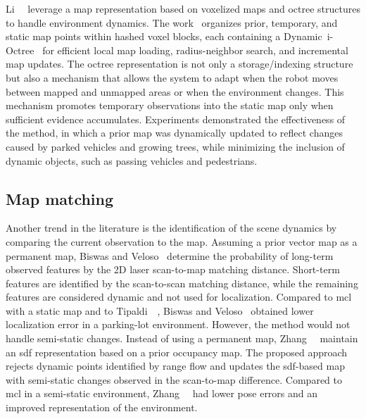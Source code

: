Li~\etal~\cite{li:tim:2025} leverage a map representation based on
voxelized maps and octree structures to handle environment dynamics.
The work~\cite{li:tim:2025} organizes prior, temporary, and static map points
within hashed voxel blocks, each containing a
Dynamic~i-Octree~\cite{zhu:icra:2024} for efficient local map loading,
radius-neighbor search, and incremental map updates.
The octree representation is not only a storage/indexing structure
but also a mechanism that allows the system to adapt when the robot
moves between mapped and unmapped areas or when the environment changes.
This mechanism promotes temporary observations into the static map
only when sufficient evidence accumulates.
Experiments demonstrated the effectiveness of the method,
in which a prior map was dynamically updated to reflect changes
caused by parked vehicles and growing trees,
while minimizing the inclusion of dynamic objects,
such as passing vehicles and pedestrians.

\subsection{Map matching}

Another trend in the literature is the identification of the scene dynamics
by comparing the current observation to the map.
Assuming a prior vector map as a permanent map,
Biswas and Veloso~\cite{biswas-veloso:ras:2017} determine
the probability of long-term observed features
by the 2D laser scan-to-map matching distance.
Short-term features are identified by the scan-to-scan matching distance, while
the remaining features are considered dynamic and not used for localization.
Compared to \gls{mcl} with a static map
and to Tipaldi~\etal~\cite{tipaldi:ijrr:2013},
Biswas and Veloso~\cite{biswas-veloso:ras:2017} obtained lower localization
error in a parking-lot environment. However, the method would not handle
semi-static changes. Instead of using a permanent map,
Zhang~\etal~\cite{zhang:acc:2019} maintain an \gls{sdf} representation
based on a prior occupancy map. The proposed approach rejects
dynamic points identified by range flow and updates the \gls{sdf}-based map
with semi-static changes observed in the scan-to-map difference.
Compared to \gls{mcl} in a semi-static environment,
Zhang~\etal~\cite{zhang:acc:2019} had lower pose errors
and an improved representation of the environment.

